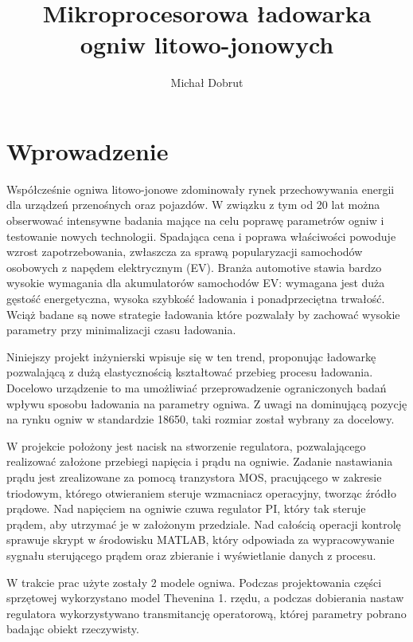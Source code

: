 \documentclass[polish,engineer]{polsl-msth}
\author{Michał Dobrut}
\title{Mikroprocesorowa ładowarka ogniw litowo-jonowych}
\begin{document}
\frontmatter
\maketitle
\makestatement
\tableofcontents
\listoftables
\listoffigures
\mainmatter

\chapter{Wprowadzenie}

Współcześnie ogniwa litowo-jonowe zdominowały rynek przechowywania energii dla urządzeń przenośnych oraz pojazdów. W związku z tym od 20 lat można obserwować intensywne badania mające na celu poprawę parametrów ogniw i testowanie nowych technologii. Spadająca cena i poprawa właściwości powoduje wzrost zapotrzebowania, zwłaszcza za sprawą popularyzacji samochodów osobowych z napędem elektrycznym (EV). Branża automotive stawia bardzo wysokie wymagania dla akumulatorów samochodów EV: wymagana jest duża gęstość energetyczna, wysoka szybkość ładowania i ponadprzeciętna trwałość. Wciąż badane są nowe strategie ładowania które pozwalały by zachować wysokie parametry przy minimalizacji czasu ładowania.

Niniejszy projekt inżynierski wpisuje się w ten trend, proponując ładowarkę pozwalającą z dużą elastycznością kształtować przebieg procesu ładowania. Docelowo urządzenie to ma umożliwiać przeprowadzenie ograniczonych badań wpływu sposobu ładowania na parametry ogniwa. Z uwagi na dominującą pozycję na rynku ogniw w standardzie 18650, taki rozmiar został wybrany za docelowy. 

W projekcie położony jest nacisk na stworzenie regulatora, pozwalającego realizować założone przebiegi napięcia i prądu na ogniwie. Zadanie nastawiania prądu jest zrealizowane za pomocą tranzystora MOS, pracującego w zakresie triodowym, którego otwieraniem steruje wzmacniacz operacyjny, tworząc źródło prądowe. Nad napięciem na ogniwie czuwa regulator PI, który tak steruje prądem, aby utrzymać je w założonym przedziale. Nad całością operacji kontrolę sprawuje skrypt w środowisku MATLAB, który odpowiada za wypracowywanie sygnału sterującego prądem oraz zbieranie i wyświetlanie danych z procesu.

W trakcie prac użyte zostały 2 modele ogniwa. Podczas projektowania części sprzętowej wykorzystano model Thevenina 1. rzędu, a podczas dobierania nastaw regulatora wykorzystywano transmitancję operatorową, której parametry pobrano badając obiekt rzeczywisty. 
\end{document}
